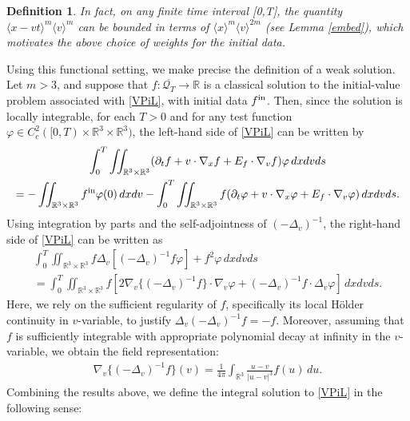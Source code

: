 \documentclass[reqno,11pt,final]{amsart}
\theoremstyle{plain}
\newtheorem{definition}[theorem]{Definition}
\numberwithin{equation}{section}
\numberwithin{theorem}{section}
\begin{document}
\begin{definition}
In fact, on any finite time interval [0,T], the quantity $\langle x-vt\rangle^{m}\langle v\rangle^{m}$ can be bounded in terms of $\langle x\rangle^{m}\langle v\rangle^{2m}$ (see Lemma \ref{embed}), which motivates the above choice of weights for the initial data.
\end{definition}

Using this functional setting, we make precise the definition of a weak solution. Let $m>3$, and suppose that $f : \overline{\mathcal{Q}_T} \to \mathbb{R}$ is a classical solution to the initial-value problem associated with \eqref{VPiL}, with initial data $f^\textup{in}$. Then, since the solution is locally integrable, for each $T>0$ and for any test function $\varphi\in C_c^{2}([0,T)\times\mathbb{R}^3\times\mathbb{R}^3)$, the left-hand side of \eqref{VPiL} can be written by
\begin{multline*}
\int_0^T\iint_{\mathbb{R}^3\times\mathbb{R}^3} (\partial_tf + v\cdot\nabla_xf + E_f\cdot\nabla_vf)\varphi\,dxdvds\\
= -\iint_{\mathbb{R}^3\times\mathbb{R}^3} f^\textup{in}\varphi(0)\,dxdv - \int_0^T\iint_{\mathbb{R}^3\times\mathbb{R}^3} f(\partial_t\varphi + v\cdot\nabla_x\varphi + E_f\cdot\nabla_v\varphi)\,dxdvds.
\end{multline*}Using integration by parts and the self-adjointness of $(-\Delta_v)^{-1}$, the right-hand side of \eqref{VPiL} can be written as
\begin{gather*}
\int_0^T \iint_{\mathbb{R}^3\times\mathbb{R}^3} f\Delta_v[(-\Delta_v)^{-1}f\varphi] + f^2\varphi\,dxdvds \\
=\int_0^T \iint_{\mathbb{R}^3\times\mathbb{R}^3} f[2\nabla_v\{(-\Delta_v)^{-1}f\}\cdot\nabla_v\varphi + (-\Delta_v)^{-1}f\cdot\Delta_v\varphi]\,dxdvds.
\end{gather*}
Here, we rely on the sufficient regularity of $f$, specifically its local H\"older continuity in $v$-variable, to justify $\Delta_v(-\Delta_v)^{-1}f = -f$. Moreover, assuming that $f$ is sufficiently integrable with appropriate polynomial decay at infinity in the $v$-variable, we obtain the field representation:
\begin{align}\label{D potential}
\nabla_v\{(-\Delta_v)^{-1}f\}(v) = \frac{1}{4\pi} \int_{\mathbb{R}^3} \frac{u-v}{|u-v|^3}f(u)\,du.
\end{align}Combining the results above, we define the integral solution to \eqref{VPiL} in the following sense:
\end{document}

